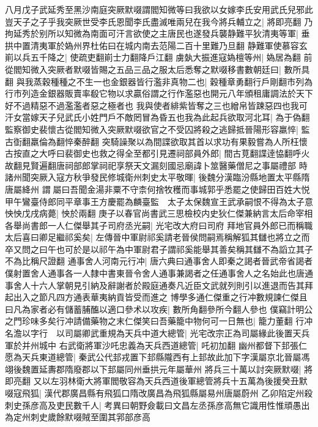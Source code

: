 八月戊子武延秀至黑沙南庭突厥默啜謂閻知微等曰我欲以女嫁李氏安用武氏兒邪此豈天子之子乎我突厥世受李氏恩聞李氏盡滅唯兩兒在我今將兵輔立之|{
	將即亮翻}
乃拘延秀於别所以知微為南面可汗言欲使之主唐民也遂發兵襲静難平狄清夷等軍|{
	垂拱中置清夷軍於媯州界杜佑曰在城内南去范陽二百十里難乃旦翻}
静難軍使慕容玄崱以兵五千降之|{
	使疏吏翻崱士力翻降戶江翻}
虜埶大振進寇媯檀等州|{
	媯居為翻}
前從閻知微入突厥者默啜皆賜之五品三品之服太后悉奪之默啜移書數朝廷曰|{
	數所具翻}
與我蒸穀種種之不生一也金銀器皆行濫非真物二也|{
	穀種章勇翻行戶剛翻市列為行市列造金銀器販賣率殽它物以求贏俗謂之行作濫惡也開元八年頒租庸調法於天下好不過精惡不過濫濫者惡之極者也}
我與使者緋紫皆奪之三也繒帛皆踈惡四也我可汗女當嫁天子兒武氏小姓門戶不敵罔冒為昏五也我為此起兵欲取河北耳|{
	為于偽翻}
監察御史裴懷古從閻知微入突厥默啜欲官之不受囚將殺之逃歸抵晉陽形容羸悴|{
	監古衘翻羸倫為翻悴秦醉翻}
突騎譟聚以為間諜欲取其首以求功有果毅嘗為人所枉懷古按直之大呼曰裴御史也救之得全至都引見遷祠部員外郎|{
	間古莧翻諜逹恊翻呼火故翻見賢遍翻唐祠部郎掌祠祀享祭天文漏刻國忌廟諱卜筮醫藥僧尼之事屬禮部}
時諸州聞突厥入寇方秋爭發民修城衛州刺史太平敬暉|{
	後魏分漢臨汾縣地置太平縣隋唐屬絳州}
謂屬曰吾聞金湯非粟不守柰何捨牧穫而事城郭乎悉罷之使歸田百姓大悦　甲午鸞臺侍郎同平章事王方慶罷為麟臺監　太子太保魏宣王武承嗣恨不得為太子意怏怏戊戌病薨|{
	怏於兩翻}
庚子以春官尚書武三思檢校内史狄仁傑兼納言太后命宰相各舉尚書郎一人仁傑舉其子司府丞光嗣|{
	光宅改大府曰司府}
拜地官員外郎已而稱職太后喜曰卿足繼祁奚矣|{
	左傳晉中軍尉祁奚請老晉侯問嗣焉稱解狐其讎也將立之而卒又問之曰午也可於是以祁午為中軍尉君子謂祁奚能舉其善矣稱其讎不為謟立其子不為比稱尺證翻}
通事舍人河南元行冲|{
	唐六典曰通事舍人即秦之謁者晉武帝省謁者僕射置舍人通事各一人隸中書東晉令舍人通事兼謁者之任通事舍人之名始此也唐通事舍人十六人掌朝見引納及辭謝者於殿庭通奏凡近臣文武就列則引以進退而告其拜起出入之節凡四方通表華夷納貢皆受而進之}
博學多通仁傑重之行冲數規諫仁傑且曰凡為家者必有儲蓄脯醢以適口參术以攻疾|{
	數所角翻參所今翻人參也}
僕竊計明公之門珍味多矣行冲請備藥物之末仁傑笑曰吾藥籠中物何可一日無也|{
	籠力董翻}
行冲名澹以字行　以司屬卿武重規為天兵中道大總管|{
	光宅改宗正為司屬緣此後置天兵軍於并州城中}
右武衛將軍沙吒忠義為天兵西道總管|{
	吒初加翻}
幽州都督下邽張仁愿為天兵東道總管|{
	秦武公代邽戎置下邽縣隴西有上邽故此加下字漢屬京北晉屬馮翊後魏置延夀郡隋廢郡以下邽屬同州垂拱元年屬華州}
將兵三十萬以討突厥默啜|{
	將即亮翻}
又以左羽林衛大將軍閻敬容為天兵西道後軍總管將兵十五萬為後援癸丑默啜寇飛狐|{
	漢代郡廣昌縣有飛狐口隋改廣昌為飛狐縣屬易州唐屬蔚州}
乙卯陷定州殺刺史孫彦高及吏民數千人|{
	考異曰朝野僉載曰文昌左丞孫彦高無它識用性惟頑愚出為定州刺史歲餘默啜賊至圍其郛部彦高}


